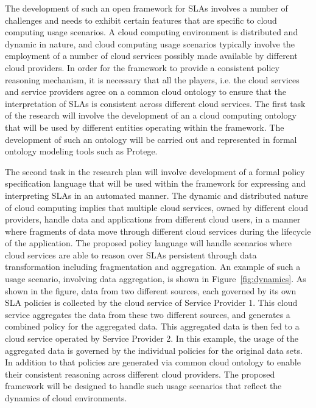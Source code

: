 \documentclass[times, 10pt,twocolumn]{article}
\begin{document}
The development of such an open framework for SLAs involves a number of challenges and needs to exhibit certain features that are specific to cloud computing usage scenarios. A cloud computing environment is distributed and dynamic in nature, and cloud computing usage scenarios typically involve the employment of a number of cloud services possibly made available by different cloud providers. In order for the framework to provide a consistent policy reasoning mechanism, it is necessary that all the players, i.e. the cloud services and service providers agree on a common cloud ontology to ensure that the interpretation of SLAs is consistent across different cloud services. The first task of the research will involve the development of an a cloud computing ontology that will be used by different entities operating within the framework. The development of such an ontology will be carried out and represented in formal ontology modeling tools such as Protege. 

The second task in the research plan will involve development of a formal policy specification language that will be used within the framework for expressing and interpreting SLAs in an automated manner.  The dynamic and distributed nature of cloud computing implies that multiple cloud services, owned by different cloud providers, handle data and applications from different cloud users, in a manner where fragments of data move through different cloud services during the lifecycle of the application. The proposed policy language will handle scenarios where cloud services are able to reason over SLAs persistent through data transformation including fragmentation and aggregation. An example of such a usage scenario, involving data aggregation, is shown in Figure~\ref{fig:dynamics}. As shown in the figure, data from two different sources, each governed by its own SLA  policies is collected by the cloud service of  Service Provider 1. This cloud service aggregates the data from these two different sources, and generates a combined policy for the aggregated data. This aggregated data is then fed to a cloud service operated by Service Provider 2. In this example, the usage of the aggregated data is governed by the individual policies for the original data sets. In addition to that policies are generated via common cloud ontology to enable their consistent reasoning across different cloud providers. The proposed framework will be designed to handle such usage scenarios that reflect the dynamics of cloud environments. 
\end{document}

